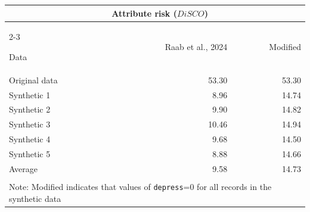 \begin{tabular}{lrr}
   
\toprule & 
\multicolumn{2}{l}{Attribute risk ($DiSCO$)}
\\  
 
\cmidrule(lr){2-3}
 
Data & Raab et al., 2024 & Modified
\\ 

\midrule
Original data & 53.30 & 53.30 \\ 
   \midrule
Synthetic 1 & 8.96 & 14.74 \\ 
  Synthetic 2 & 9.90 & 14.82 \\ 
  Synthetic 3 & 10.46 & 14.94 \\ 
  Synthetic 4 & 9.68 & 14.50 \\ 
  Synthetic 5 & 8.88 & 14.66 \\ 
   \midrule
Average & 9.58 & 14.73 \\ 
   \bottomrule \\[-1.8ex] \multicolumn{3}{p{2in}}{Note: Modified indicates that values of \texttt{depress}=0 for all records in the synthetic data} 
\end{tabular}
